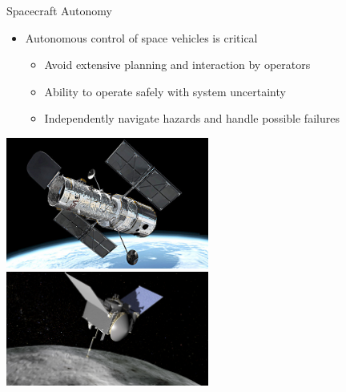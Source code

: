 \begin{frame}[t]{Spacecraft Autonomy} %
\begin{itemize}
    \item Autonomous control of space vehicles is critical
    \begin{itemize}
        \item Avoid extensive planning and interaction by operators
        \item Ability to operate safely with system uncertainty 
        \item Independently navigate hazards and handle possible failures
    \end{itemize}
\end{itemize}
\pause
\begin{center}
    \includegraphics[width=0.5\textwidth,height=0.35\textheight,keepaspectratio]{figures/2016ACC/hubble.jpg}\hfill
    \includegraphics[width=0.5\textwidth,height=0.4\textheight,keepaspectratio]{figures/osires_rex.png}
\end{center}

\end{frame}   %


